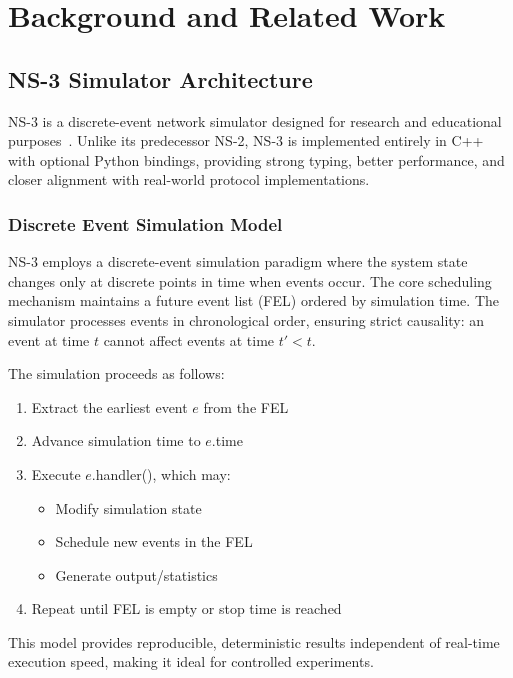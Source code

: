 \section{Background and Related Work}
\label{sec:background}

\subsection{NS-3 Simulator Architecture}

NS-3 is a discrete-event network simulator designed for research and educational purposes~\cite{ns3}. Unlike its predecessor NS-2, NS-3 is implemented entirely in C++ with optional Python bindings, providing strong typing, better performance, and closer alignment with real-world protocol implementations.

\subsubsection{Discrete Event Simulation Model}

NS-3 employs a discrete-event simulation paradigm where the system state changes only at discrete points in time when events occur. The core scheduling mechanism maintains a future event list (FEL) ordered by simulation time. The simulator processes events in chronological order, ensuring strict causality: an event at time $t$ cannot affect events at time $t' < t$.

The simulation proceeds as follows:
\begin{enumerate}
    \item Extract the earliest event $e$ from the FEL
    \item Advance simulation time to $e$.time
    \item Execute $e$.handler(), which may:
    \begin{itemize}
        \item Modify simulation state
        \item Schedule new events in the FEL
        \item Generate output/statistics
    \end{itemize}
    \item Repeat until FEL is empty or stop time is reached
\end{enumerate}

This model provides reproducible, deterministic results independent of real-time execution speed, making it ideal for controlled experiments.

